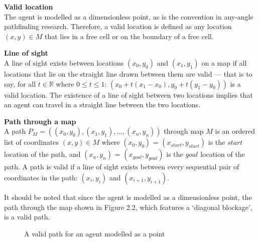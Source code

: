 \documentclass[12pt,notitlepage]{report}
\begin{document}
\begin{description}
\item{\bfseries Valid location}\\
The agent is modelled as a dimensionless point, as is the convention\cite{Daniel10} in any-angle pathfinding research. Therefore, a valid location is defined as any location $(x,y) \in M$ that lies in a free cell or on the boundary of a free cell.\\

\item{\bfseries Line of sight}\\
A line of sight exists between locations $(x_{0},y_{0})$ and $(x_{1},y_{1})$ on a map if all locations that lie on the straight line drawn between them are valid --- that is to say, for all $t \in \mathbb{R}$ where $0 \leq t \leq 1$: $(x_{0} + t(x_{1}-x_{0}),y_{0} + t(y_{1}-y_{0}))$ is a valid location. The existence of a line of sight between two locations implies that an agent can travel in a straight line between the two locations.\\

\item{\bfseries Path through a map}\\
A path  $P_{M} = ((x_{0},y_{0}), (x_{1},y_{1}), \ldots, (x_{n},y_{n}))$ through map $M$ is an ordered list of coordinates $(x,y) \in M$ where $(x_{0},y_{0})$ = $(x_{start},y_{start})$ is the $start$ location of the path, and $(x_{n},y_{n})$ = $(x_{goal},y_{goal})$ is the $goal$ location of the path. A path is valid if a line of sight exists between every sequential pair of coordinates in the path: $(x_{i},y_{i})$ and $(x_{i+1},y_{i+1})$.\\
\end{description}

\noindent
It should be noted that since the agent is modelled as a dimensionless point, the path through the map shown in Figure 2.2, which features a `diagonal blockage', is a valid path.\\

\begin{figure}
    \centering
  \caption{A valid path for an agent modelled as a point}
\end{figure}
\end{document}
